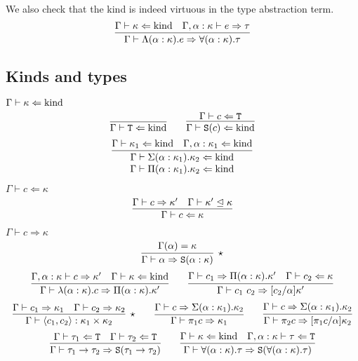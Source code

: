 We also check that the kind is indeed virtuous in the type abstraction term.
\[
  \infer{\Gamma \vdash \Lambda(\alpha : \kappa).e \Rightarrow \forall(\alpha : \kappa).\tau}
    {\Gamma \vdash \kappa \Leftarrow \kind
    &\Gamma, \alpha : \kappa \vdash e \Rightarrow \tau
   }
\]

\subsection{Kinds and types}
\begin{judgment}
  $\Gamma \vdash \kappa \Leftarrow \textnormal{kind}$
  \[
    \infer{\Gamma \vdash \T \Leftarrow \kind}{}
    \qquad
    \infer{\Gamma \vdash \S(c) \Leftarrow \kind}
          {\Gamma \vdash c \Leftarrow \T}
  \]
  \[
    \infer{
      \deduce
        {\Gamma \vdash \Pi(\alpha : \kappa_1).\kappa_2 \Leftarrow \kind}
        {\Gamma \vdash \Sigma(\alpha : \kappa_1).\kappa_2 \Leftarrow \kind}
      }
      {\Gamma \vdash \kappa_1 \Leftarrow \kind
      &\Gamma, \alpha : \kappa_1 \Leftarrow\kind
      }
  \]
\end{judgment}

\begin{judgment}
  $\Gamma \vdash c \Leftarrow \kappa$
  \[
    \infer
      {\Gamma \vdash c \Leftarrow \kappa}
      {\Gamma \vdash c \Rightarrow \kappa'
      &\Gamma \vdash \kappa' \trianglelefteq \kappa
      }
  \]
\end{judgment}

\begin{judgment}
  $\Gamma \vdash c \Rightarrow \kappa$
  \[
    \infer[\star]
      {\Gamma \vdash \alpha \Rightarrow \S(\alpha : \kappa)}
      {\Gamma(\alpha) = \kappa}
  \]
  \[
    \infer{\Gamma \vdash \lambda(\alpha : \kappa).c \Rightarrow \Pi(\alpha : \kappa). \kappa'}
      {\Gamma, \alpha : \kappa \vdash c \Rightarrow \kappa'
      &\Gamma \vdash \kappa \Leftarrow \kind
      }
    \qquad
    \infer{\Gamma \vdash c_1~c_2 \Rightarrow [c_2 / \alpha] \kappa'}
      {\Gamma \vdash c_1 \Rightarrow \Pi(\alpha : \kappa). \kappa'
      &\Gamma \vdash c_2 \Leftarrow \kappa
      }
  \]
  \[
    \infer[\star]{\Gamma \vdash \langle c_1, c_2 \rangle : \kappa_1 \times \kappa_2}
      {\Gamma \vdash c_1 \Rightarrow \kappa_1
      &\Gamma \vdash c_2 \Rightarrow \kappa_2
      }
    \qquad
    \infer{\Gamma \vdash \pi_1c \Rightarrow \kappa_1}
      {\Gamma \vdash c \Rightarrow \Sigma(\alpha : \kappa_1).\kappa_2}
    \qquad
    \infer{\Gamma \vdash \pi_2c \Rightarrow [\pi_1c/\alpha]\kappa_2}
      {\Gamma \vdash c \Rightarrow \Sigma(\alpha : \kappa_1).\kappa_2}
  \]
  \[
    \infer{\Gamma \vdash \tau_1 \rightarrow \tau_2 \Rightarrow \S(\tau_1 \rightarrow \tau_2)}
      {\Gamma \vdash \tau_1 \Leftarrow \T
      &\Gamma \vdash \tau_2 \Leftarrow \T
      }
    \qquad
    \infer
      {\Gamma \vdash \forall (\alpha: \kappa).\tau \Rightarrow \S(\forall(\alpha : \kappa).\tau)}
      {\Gamma \vdash \kappa \Leftarrow \kind
      &\Gamma, \alpha : \kappa \vdash \tau \Leftarrow \T
      }
  \]
\end{judgment}

